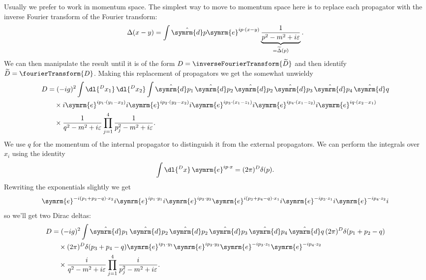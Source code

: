 \documentclass[fleqn]{NotesClass}
\newcommand{\e}{\symrm{e}}
\newcommand{\dhat}[1]{\hat{\symrm{d}}{#1}}
\begin{document}
    Usually we prefer to work in momentum space.
    The simplest way to move to momentum space here is to replace each propagator with the inverse Fourier transform of the Fourier transform:
    \begin{equation}
        \Delta(x - y) = \int \dhat{p} \e^{ip \cdot (x - y)} \underbrace{\frac{1}{p^2 - m^2 + i\varepsilon}}_{= \widetilde{\Delta}(p)}.
    \end{equation}
    We can then manipulate the result until it is of the form \(D = \inverseFourierTransform\{\widetilde{D}\}\) and then identify \(\widetilde{D} = \fourierTransform\{D\}\).
    Making this replacement of propagators we get the somewhat unwieldy
    \begin{align}
        D &= (-ig)^2 \int \dl{^Dx_1} \, \dl{^Dx_2} \int \dhat{p_1} \, \dhat{p_2} \, \dhat{p_2} \, \dhat{p_3} \, \dhat{p_4} \, \dhat{q} \notag\\
        &\quad\times i\e^{ip_1 \cdot (y_1 - x_2)} i\e^{ip_2 \cdot (y_2 - x_2)} i\e^{ip_3 \cdot (x_1 - z_1)} i\e^{ip_4 \cdot (x_1 - z_2)} i\e^{iq \cdot (x_2 - x_1)} \notag\\
        &\quad\times \frac{1}{q^2 - m^2 + i\varepsilon} \prod_{j=1}^{4} \frac{1}{p_j^2 - m^2 + i\varepsilon}.
    \end{align}
    We use \(q\) for the momentum of the internal propagator to distinguish it from the external propagators.
    We can perform the integrals over \(x_i\) using the identity
    \begin{equation}
        \int \dl{^Dx} \, \e^{ip \cdot x} = (2\pi)^D\delta(p).
    \end{equation}
    Rewriting the exponentials slightly we get
    \begin{equation}
        \e^{-i(p_1 + p_2 - q) \cdot x_2} i\e^{ip_1 \cdot y_1} i\e^{ip_2 \cdot y_2} \e^{i(p_3 + p_4 - q) \cdot x_1} i\e^{-ip_3 \cdot z_1} i\e^{-ip_4 \cdot z_2} i
    \end{equation}
    so we'll get two Dirac deltas:
    \begin{align}
        D &= (-ig)^2 \int \dhat{p_1} \, \dhat{p_2} \, \dhat{p_2} \, \dhat{p_3} \, \dhat{p_4} \, \dhat{q} \, (2\pi)^D \delta(p_1 + p_2 - q) \notag\\
        &\quad\times  (2\pi)^D \delta(p_3 + p_4 - q) \e^{ip_1 \cdot y_1} \e^{ip_2 \cdot y_2}  \e^{-ip_3 \cdot z_1} \e^{-ip_4 \cdot z_2} \notag\\
        &\quad\times \frac{i}{q^2 - m^2 + i\varepsilon} \prod_{j=1}^{4} \frac{i}{p_j^2 - m^2 + i\varepsilon}.
    \end{align}
\end{document}
